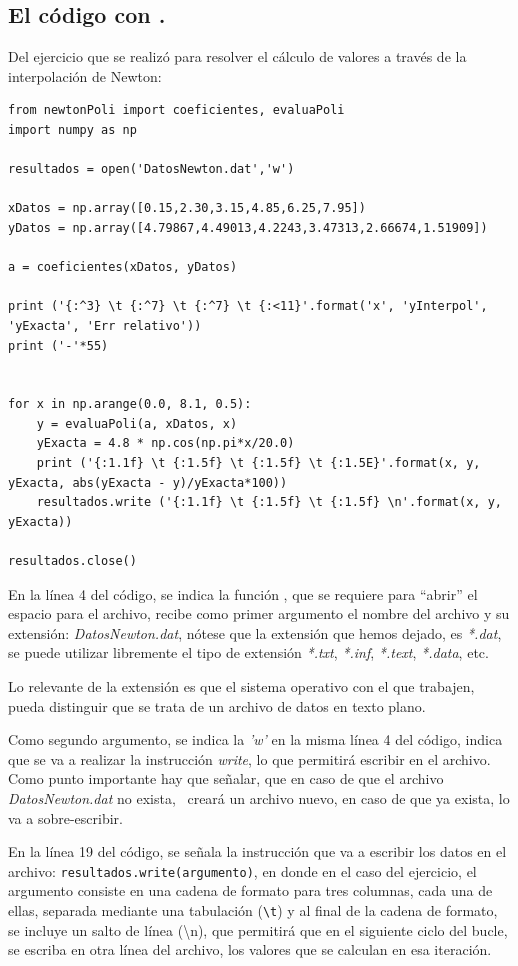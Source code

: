 \subsection{El código con \python.}
Del ejercicio que se realizó para resolver el cálculo de valores a través de la interpolación de Newton:
\begin{lstlisting}[style= FormattedNumber, basicstyle=\linespread{1.1}\ttfamily=\normal, columns=fullflexible]
from newtonPoli import coeficientes, evaluaPoli
import numpy as np

resultados = open('DatosNewton.dat','w')

xDatos = np.array([0.15,2.30,3.15,4.85,6.25,7.95])
yDatos = np.array([4.79867,4.49013,4.2243,3.47313,2.66674,1.51909])

a = coeficientes(xDatos, yDatos)

print ('{:^3} \t {:^7} \t {:^7} \t {:<11}'.format('x', 'yInterpol', 'yExacta', 'Err relativo'))
print ('-'*55)


for x in np.arange(0.0, 8.1, 0.5):
    y = evaluaPoli(a, xDatos, x)
    yExacta = 4.8 * np.cos(np.pi*x/20.0)
    print ('{:1.1f} \t {:1.5f} \t {:1.5f} \t {:1.5E}'.format(x, y, yExacta, abs(yExacta - y)/yExacta*100))
    resultados.write ('{:1.1f} \t {:1.5f} \t {:1.5f} \n'.format(x, y, yExacta))
    
resultados.close()
\end{lstlisting}
En la línea 4 del código, se indica la función , que se requiere para \enquote{abrir} el espacio para el archivo, recibe como primer argumento el nombre del archivo y su extensión: \emph{DatosNewton.dat}, nótese que la extensión que hemos dejado, es \emph{*.dat}, se puede utilizar libremente el tipo de extensión \emph{*.txt}, \emph{*.inf}, \emph{*.text}, \emph{*.data}, etc.
\par
Lo relevante de la extensión es que el sistema operativo con el que trabajen, pueda distinguir que se trata de un archivo de datos en texto plano.
\par
Como segundo argumento, se indica la \textit{'w'} en la misma línea 4 del código, indica que se va a realizar la instrucción \textit{write}, lo que permitirá escribir en el archivo. Como punto importante hay que señalar, que en caso de que el archivo \textit{DatosNewton.dat} no exista, \python\ creará un archivo nuevo, en caso de que ya exista, lo va a sobre-escribir.
\par
En la línea 19 del código, se señala la instrucción que va a escribir los datos en el archivo: \texttt{resultados.write(argumento)}, en donde en el caso del ejercicio, el argumento consiste en una cadena de formato para tres columnas, cada una de ellas, separada mediante una tabulación (\texttt{\textbackslash t}) y al final de la cadena de formato, se incluye un salto de línea (\textbackslash n), que permitirá que en el siguiente ciclo del bucle, se escriba en otra línea del archivo, los valores que se calculan en esa iteración.
